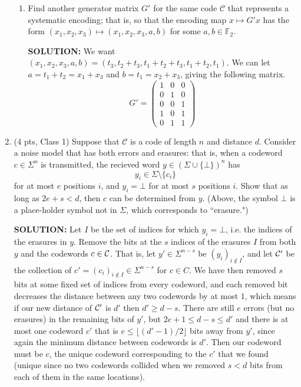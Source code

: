 \documentclass{article}
\newcommand{\cC}{\mathcal{C}}
\newcommand{\F}{\mathbb{F}}
\begin{document}
\begin{enumerate}
\begin{enumerate}
	\item Find another generator matrix $G'$ for the same code $\cC$ that represents a systematic encoding; that is, so that the encoding map $x \mapsto G'x$ has the form
$(x_1,x_2,x_3) \mapsto (x_1,x_2,x_3,a,b)$ for some $a,b \in \F_2$.

\begin{shaded}
\textbf{SOLUTION:}
We want $(x_1, x_2, x_3, a, b) = (t_3, t_2+t_3, t_1+t_2+t_3, t_1+t_2, t_1)$. We can let $a = t_1+t_2 = x_1 + x_3$ and $b = t_1 = x_2 + x_3$, giving the following matrix.
\[G' = \begin{pmatrix}
    1 & 0 & 0 \\
    0 & 1 & 0 \\
    0 & 0 & 1 \\
    1 & 0 & 1 \\
    0 & 1 & 1
\end{pmatrix}\]
\end{shaded}

\end{enumerate}

\item (4 pts, Class 1) Suppose that $\cC$ is a code of length $n$ and distance $d$.  Consider a noise model that has both errors and erasures: that is, when a codeword $c \in \Sigma^n$ is transmitted, the recieved word $y \in (\Sigma \cup \{\bot\})^n$ has
\[ y_i \in \Sigma \setminus \{ c_i \} \] 
for at most $e$ positions $i$, and $y_i = \bot$ for at most $s$ positions $i$.  Show that as long as $2e + s < d$, then $c$ can be determined from $y$.
(Above, the symbol $\bot$ is a place-holder symbol not in $\Sigma$, which corresponds to ``erasure.")

\begin{shaded}
\textbf{SOLUTION:}
Let $I$ be the set of indices for which $y_i = \bot$, i.e. the indices of the erasures in $y$. Remove the bits at the $s$ indices of the erasures $I$ from both $y$ and the codewords $c \in \mathcal{C}$. That is, let $y' \in \Sigma^{n - s}$ be $(y_i)_{i \not \in I}$, and let $\mathcal{C}'$ be the collection of $c' = (c_i)_{i \not \in I} \in \Sigma^{n-s}$ for $c \in C$. We have then removed $s$ bits at some fixed set of indices from every codeword, and each removed bit decreases the distance between any two codewords by at most $1$, which means if our new distance of $\mathcal{C}'$ is $d'$ then $d'\geq d - s$. There are still $e$ errors (but no erasures) in the remaining bits of $y'$, but $2e + 1 \leq d -s \leq d'$ and there is at most one codeword $c'$ that is $e \leq \lfloor (d'-1)/2\rfloor$ bits away from $y'$, since again the minimum distance between codewords is $d'$. Then our codeword must be $c$, the unique codeword corresponding to the $c'$ that we found (unique since no two codewords collided when we removed $s < d$ bits from each of them in the same locations).
\end{shaded}

\end{enumerate}
\end{document}
